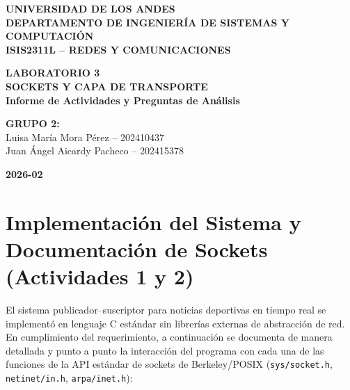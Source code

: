 \documentclass[11pt,a4paper]{article}
\begin{document}
\begin{titlepage}
    \begin{center}
    
    \vspace*{0.5cm}
    
    {\Large\textbf{UNIVERSIDAD DE LOS ANDES}}\\[0.2cm]
    {\large\textbf{DEPARTAMENTO DE INGENIERÍA DE SISTEMAS Y COMPUTACIÓN}}\\[0.2cm]
    {\normalsize\textbf{ISIS2311L -- REDES Y COMUNICACIONES}}
    
    \vfill
    
    {\Large\textbf{LABORATORIO 3}}\\[0.8cm]
    {\LARGE\textbf{SOCKETS Y CAPA DE TRANSPORTE}}\\[0.4cm]
    {\large\textbf{Informe de Actividades y Preguntas de Análisis}}
    
    \vspace{1.5cm}
    
    {\large\textbf{GRUPO 2:}}\\[0.5cm]
    {\large
    Luisa María Mora Pérez -- 202410437\\
    Juan Ángel Aicardy Pacheco -- 202415378
    }
    
    \vfill
    
    {\large\textbf{2026-02}}
    
    \end{center}
\end{titlepage}

\tableofcontents
\newpage

\section{Implementación del Sistema y Documentación de Sockets (Actividades 1 y 2)}

El sistema publicador--suscriptor para noticias deportivas en tiempo real se implementó en lenguaje C estándar sin librerías externas de abstracción de red. En cumplimiento del requerimiento, a continuación se documenta de manera detallada y punto a punto la interacción del programa con cada una de las funciones de la API estándar de sockets de Berkeley/POSIX (\texttt{sys/socket.h}, \texttt{netinet/in.h}, \texttt{arpa/inet.h}):
\end{document}
